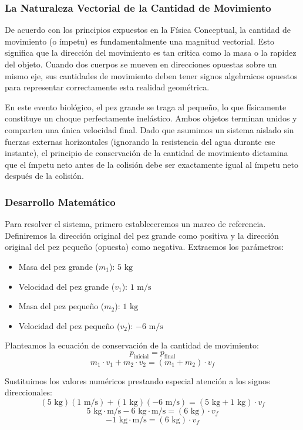 \documentclass{article}
\begin{document}
\subsubsection*{La Naturaleza Vectorial de la Cantidad de Movimiento}
De acuerdo con los principios expuestos en la Física Conceptual, la cantidad de movimiento (o ímpetu) es fundamentalmente una magnitud vectorial. Esto significa que la dirección del movimiento es tan crítica como la masa o la rapidez del objeto. Cuando dos cuerpos se mueven en direcciones opuestas sobre un mismo eje, sus cantidades de movimiento deben tener signos algebraicos opuestos para representar correctamente esta realidad geométrica.

En este evento biológico, el pez grande se traga al pequeño, lo que físicamente constituye un choque perfectamente inelástico. Ambos objetos terminan unidos y comparten una única velocidad final. Dado que asumimos un sistema aislado sin fuerzas externas horizontales (ignorando la resistencia del agua durante ese instante), el principio de conservación de la cantidad de movimiento dictamina que el ímpetu neto antes de la colisión debe ser exactamente igual al ímpetu neto después de la colisión.

\subsubsection*{Desarrollo Matemático}
Para resolver el sistema, primero estableceremos un marco de referencia. Definiremos la dirección original del pez grande como positiva y la dirección original del pez pequeño (opuesta) como negativa. Extraemos los parámetros:
\begin{itemize}
    \item Masa del pez grande ($m_1$): $5 \text{ kg}$
    \item Velocidad del pez grande ($v_1$): $1 \text{ m/s}$
    \item Masa del pez pequeño ($m_2$): $1 \text{ kg}$
    \item Velocidad del pez pequeño ($v_2$): $-6 \text{ m/s}$
\end{itemize}

Planteamos la ecuación de conservación de la cantidad de movimiento:
$$p_{\text{inicial}} = p_{\text{final}}$$
$$m_1 \cdot v_1 + m_2 \cdot v_2 = (m_1 + m_2) \cdot v_f$$

Sustituimos los valores numéricos prestando especial atención a los signos direccionales:
$$(5 \text{ kg})(1 \text{ m/s}) + (1 \text{ kg})(-6 \text{ m/s}) = (5 \text{ kg} + 1 \text{ kg}) \cdot v_f$$
$$5 \text{ kg}\cdot\text{m/s} - 6 \text{ kg}\cdot\text{m/s} = (6 \text{ kg}) \cdot v_f$$
$$-1 \text{ kg}\cdot\text{m/s} = (6 \text{ kg}) \cdot v_f$$
\end{document}
